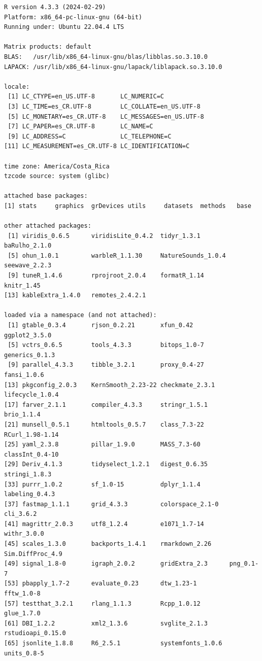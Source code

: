 \documentclass[
  letterpaper,
  DIV=11,
  numbers=noendperiod]{scrartcl}
\begin{document}
\begin{verbatim}
R version 4.3.3 (2024-02-29)
Platform: x86_64-pc-linux-gnu (64-bit)
Running under: Ubuntu 22.04.4 LTS

Matrix products: default
BLAS:   /usr/lib/x86_64-linux-gnu/blas/libblas.so.3.10.0 
LAPACK: /usr/lib/x86_64-linux-gnu/lapack/liblapack.so.3.10.0

locale:
 [1] LC_CTYPE=en_US.UTF-8       LC_NUMERIC=C              
 [3] LC_TIME=es_CR.UTF-8        LC_COLLATE=en_US.UTF-8    
 [5] LC_MONETARY=es_CR.UTF-8    LC_MESSAGES=en_US.UTF-8   
 [7] LC_PAPER=es_CR.UTF-8       LC_NAME=C                 
 [9] LC_ADDRESS=C               LC_TELEPHONE=C            
[11] LC_MEASUREMENT=es_CR.UTF-8 LC_IDENTIFICATION=C       

time zone: America/Costa_Rica
tzcode source: system (glibc)

attached base packages:
[1] stats     graphics  grDevices utils     datasets  methods   base     

other attached packages:
 [1] viridis_0.6.5      viridisLite_0.4.2  tidyr_1.3.1        baRulho_2.1.0     
 [5] ohun_1.0.1         warbleR_1.1.30     NatureSounds_1.0.4 seewave_2.2.3     
 [9] tuneR_1.4.6        rprojroot_2.0.4    formatR_1.14       knitr_1.45        
[13] kableExtra_1.4.0   remotes_2.4.2.1   

loaded via a namespace (and not attached):
 [1] gtable_0.3.4       rjson_0.2.21       xfun_0.42          ggplot2_3.5.0     
 [5] vctrs_0.6.5        tools_4.3.3        bitops_1.0-7       generics_0.1.3    
 [9] parallel_4.3.3     tibble_3.2.1       proxy_0.4-27       fansi_1.0.6       
[13] pkgconfig_2.0.3    KernSmooth_2.23-22 checkmate_2.3.1    lifecycle_1.0.4   
[17] farver_2.1.1       compiler_4.3.3     stringr_1.5.1      brio_1.1.4        
[21] munsell_0.5.1      htmltools_0.5.7    class_7.3-22       RCurl_1.98-1.14   
[25] yaml_2.3.8         pillar_1.9.0       MASS_7.3-60        classInt_0.4-10   
[29] Deriv_4.1.3        tidyselect_1.2.1   digest_0.6.35      stringi_1.8.3     
[33] purrr_1.0.2        sf_1.0-15          dplyr_1.1.4        labeling_0.4.3    
[37] fastmap_1.1.1      grid_4.3.3         colorspace_2.1-0   cli_3.6.2         
[41] magrittr_2.0.3     utf8_1.2.4         e1071_1.7-14       withr_3.0.0       
[45] scales_1.3.0       backports_1.4.1    rmarkdown_2.26     Sim.DiffProc_4.9  
[49] signal_1.8-0       igraph_2.0.2       gridExtra_2.3      png_0.1-7         
[53] pbapply_1.7-2      evaluate_0.23      dtw_1.23-1         fftw_1.0-8        
[57] testthat_3.2.1     rlang_1.1.3        Rcpp_1.0.12        glue_1.7.0        
[61] DBI_1.2.2          xml2_1.3.6         svglite_2.1.3      rstudioapi_0.15.0 
[65] jsonlite_1.8.8     R6_2.5.1           systemfonts_1.0.6  units_0.8-5       
\end{verbatim}
\end{document}
